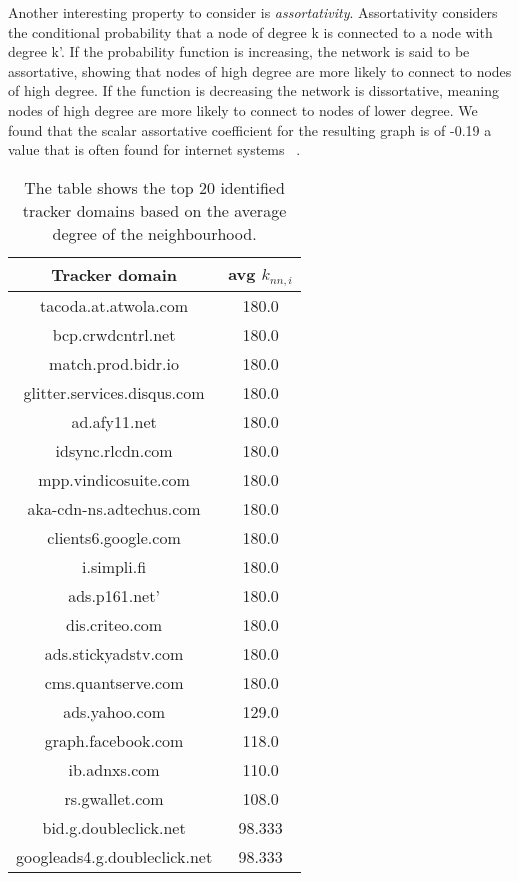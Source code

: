 Another interesting property to consider is \emph{assortativity}. Assortativity considers the conditional probability that a node of degree k is connected to a node with degree k'. If the probability function is increasing, the network is said to be assortative, showing that nodes of high degree are more likely to connect to nodes of high degree. If the function is decreasing the network is dissortative, meaning nodes of high degree are more likely to connect to nodes of lower degree. We found that the scalar assortative coefficient for the resulting graph is of -0.19 a value that is often found for internet systems ~\cite{noldus2015assortativity}.

\begin{table}[h!]				
\centering																												
\begin{tabular}{ || c | c || } 
\hline
Tracker domain & avg $k_{nn,i}$ \\
\hline
\hline
tacoda.at.atwola.com & 180.0 \\
bcp.crwdcntrl.net & 180.0 \\
match.prod.bidr.io & 180.0 \\
glitter.services.disqus.com & 180.0 \\
ad.afy11.net & 180.0 \\
idsync.rlcdn.com &180.0 \\
mpp.vindicosuite.com & 180.0 \\
aka-cdn-ns.adtechus.com & 180.0 \\
clients6.google.com & 180.0 \\
i.simpli.fi & 180.0 \\
ads.p161.net' & 180.0 \\
dis.criteo.com & 180.0 \\
ads.stickyadstv.com & 180.0 \\
cms.quantserve.com & 180.0 \\
ads.yahoo.com & 129.0 \\
graph.facebook.com & 118.0 \\
ib.adnxs.com & 110.0 \\
rs.gwallet.com & 108.0 \\
bid.g.doubleclick.net & 98.333\\
googleads4.g.doubleclick.net & 98.333\\
\hline
\end{tabular}
\\[2.5pt]
\caption{\label{tabletrackers} The table shows the top 20 identified tracker domains based on the average degree of the neighbourhood.}
\end{table}

